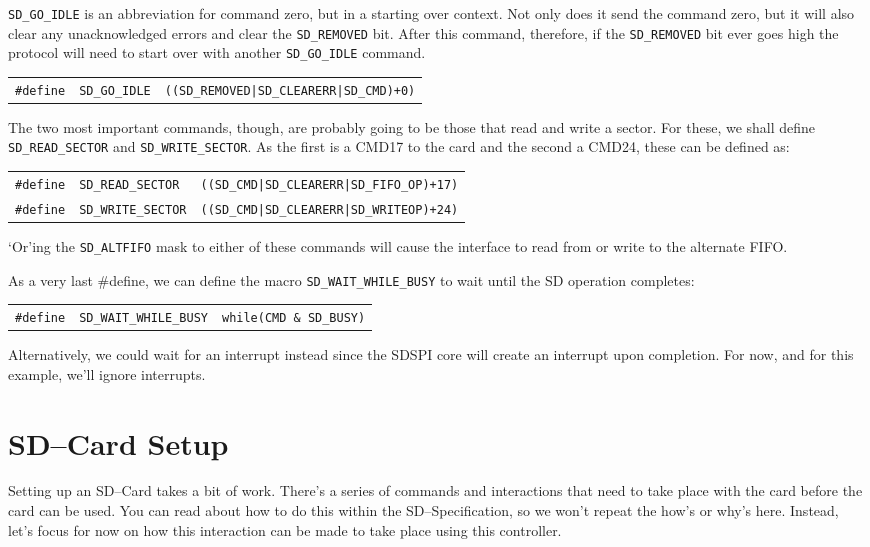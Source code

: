 \documentclass{gqtekspec}
\begin{document}
{\tt SD\_GO\_IDLE} is an abbreviation for command zero, but in a starting over
context.  Not only does it send the command zero, but it will also clear any
unacknowledged errors and clear the {\tt SD\_REMOVED} bit.  After this command,
therefore, if the {\tt SD\_REMOVED} bit ever goes high the protocol will need
to start over with another {\tt SD\_GO\_IDLE} command.
\begin{tabular}{lll}
{\tt \#define} & {\tt SD\_GO\_IDLE} & {\tt ((SD\_REMOVED|SD\_CLEARERR|SD\_CMD)+0)}
\end{tabular}

The two most important commands, though, are probably going to be those that
read and write a sector.  For these, we shall define {\tt SD\_READ\_SECTOR}
and {\tt SD\_WRITE\_SECTOR}.  As the first is a CMD17 to the card and the second
a CMD24, these can be defined as:

\begin{tabular}{lll}
{\tt \#define} & {\tt SD\_READ\_SECTOR} & {\tt ((SD\_CMD|SD\_CLEARERR|SD\_FIFO\_OP)+17)} \\
{\tt \#define} & {\tt SD\_WRITE\_SECTOR} & {\tt ((SD\_CMD|SD\_CLEARERR|SD\_WRITEOP)+24)}
\end{tabular}

`Or'ing the {\tt SD\_ALTFIFO} mask to either of these commands will cause the
interface to read from or write to the alternate FIFO.

As a very last \#define, we can define the macro {\tt SD\_WAIT\_WHILE\_BUSY}
to wait until the SD operation completes:

\begin{tabular}{lll}
{\tt \#define} & {\tt SD\_WAIT\_WHILE\_BUSY}&{\tt while(CMD \& SD\_BUSY)}
\end{tabular}

Alternatively, we could wait for an interrupt instead since the SDSPI core
will create an interrupt upon completion.  For now, and for this example,
we'll ignore interrupts.

\section{SD--Card Setup}
Setting up an SD--Card takes a bit of work.  There's a series of commands 
and interactions that need to take place with the card before the card can
be used.  You can read about how to do this within the SD--Specification, so
we won't repeat the how's or why's here.  Instead, let's focus for now on 
how this interaction can be made to take place using this controller.
\end{document}
